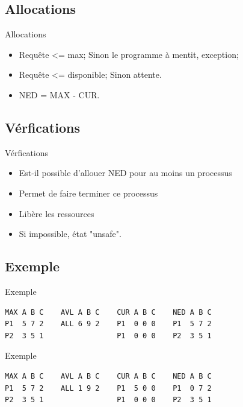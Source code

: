 \begin{frame}{\sectitle}
\def\subsectitle{Allocations}
\subsection{\subsectitle}
\begin{block}{\subsectitle}
\begin{itemize}
    \item Requête <= max; Sinon le programme à mentit, exception;
    \item Requête <= disponible; Sinon attente.
    \item NED = MAX - CUR.
\end{itemize}
\end{block}

\def\subsectitle{Vérfications}
\subsection{\subsectitle}
\begin{block}{\subsectitle}
\begin{itemize}
    \item Est-il possible d'allouer NED pour au moins un processus 
    \item Permet de faire terminer ce processus
    \item Libère les ressources
    \item Si impossible, état "unsafe". 
\end{itemize}
\end{block} 
\end{frame}

\begin{frame}[containsverbatim]{\sectitle}
\def\subsectitle{Exemple}
\subsection{\subsectitle}
\begin{exampleblock}{\subsectitle}
\begin{verbatim}
MAX A B C    AVL A B C    CUR A B C    NED A B C
P1  5 7 2    ALL 6 9 2    P1  0 0 0    P1  5 7 2
P2  3 5 1                 P1  0 0 0    P2  3 5 1
\end{verbatim}
\end{exampleblock}

\begin{exampleblock}{\subsectitle}
\begin{verbatim}
MAX A B C    AVL A B C    CUR A B C    NED A B C
P1  5 7 2    ALL 1 9 2    P1  5 0 0    P1  0 7 2
P2  3 5 1                 P1  0 0 0    P2  3 5 1
\end{verbatim}
\end{exampleblock}

\end{frame}



